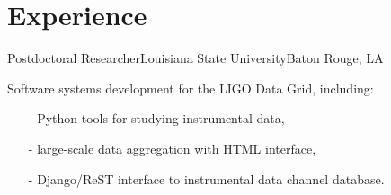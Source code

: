 \section{Experience}

%
    {Postdoctoral Researcher}{Louisiana State University}{Baton Rouge, LA}{}%
    {Software systems development for the LIGO Data Grid, including:
     \begin{itemize}
         \setlength{\itemindent}{1cm}
         \item[-] Python tools for studying instrumental data,
         \item[-] large-scale data aggregation with HTML interface,
         \item[-] Django/ReST interface to instrumental data channel database.
     \end{itemize}
    }

